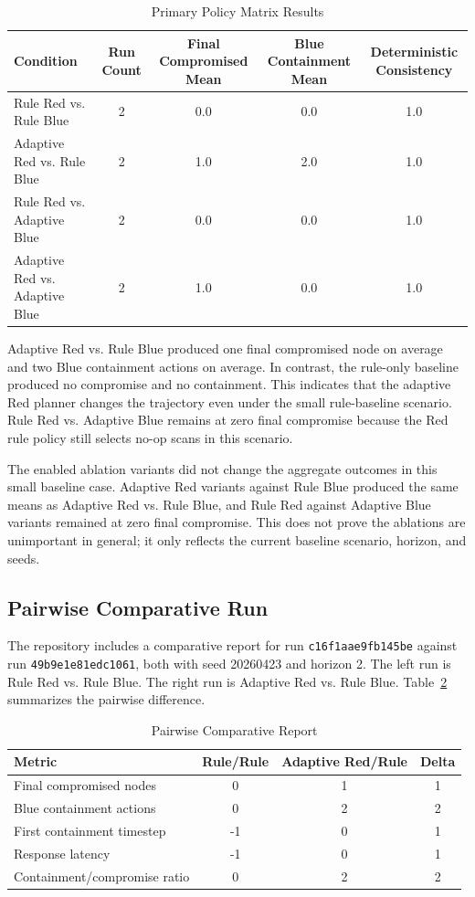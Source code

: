 \documentclass[conference]{IEEEtran}
\begin{document}
\begin{table}[htbp]
\centering
\caption{Primary Policy Matrix Results}
\label{tab:policy_results_comparison}
\begin{tabular}{|l|c|c|c|c|}
\hline
\textbf{Condition} & \textbf{Run Count} & \textbf{Final Compromised Mean} & \textbf{Blue Containment Mean} & \textbf{Deterministic Consistency} \\
\hline
Rule Red vs. Rule Blue & 2 & 0.0 & 0.0 & 1.0 \\
\hline
Adaptive Red vs. Rule Blue & 2 & 1.0 & 2.0 & 1.0 \\
\hline
Rule Red vs. Adaptive Blue & 2 & 0.0 & 0.0 & 1.0 \\
\hline
Adaptive Red vs. Adaptive Blue & 2 & 1.0 & 0.0 & 1.0 \\
\hline
\end{tabular}
\end{table}

Adaptive Red vs. Rule Blue produced one final compromised node on average and two Blue containment actions on average. In contrast, the rule-only baseline produced no compromise and no containment. This indicates that the adaptive Red planner changes the trajectory even under the small rule-baseline scenario. Rule Red vs. Adaptive Blue remains at zero final compromise because the Red rule policy still selects no-op scans in this scenario.

The enabled ablation variants did not change the aggregate outcomes in this small baseline case. Adaptive Red variants against Rule Blue produced the same means as Adaptive Red vs. Rule Blue, and Rule Red against Adaptive Blue variants remained at zero final compromise. This does not prove the ablations are unimportant in general; it only reflects the current baseline scenario, horizon, and seeds.

\subsection{Pairwise Comparative Run}
The repository includes a comparative report for run \texttt{c16f1aae9fb145be} against run \texttt{49b9e1e81edc1061}, both with seed 20260423 and horizon 2. The left run is Rule Red vs. Rule Blue. The right run is Adaptive Red vs. Rule Blue. Table~\ref{tab:comparative_results} summarizes the pairwise difference.

\begin{table}[H]
\centering
\caption{Pairwise Comparative Report}
\label{tab:comparative_results}
\begin{tabular}{|l|c|c|c|}
\hline
\textbf{Metric} & \textbf{Rule/Rule} & \textbf{Adaptive Red/Rule} & \textbf{Delta} \\
\hline
Final compromised nodes & 0 & 1 & 1 \\
\hline
Blue containment actions & 0 & 2 & 2 \\
\hline
First containment timestep & -1 & 0 & 1 \\
\hline
Response latency & -1 & 0 & 1 \\
\hline
Containment/compromise ratio & 0 & 2 & 2 \\
\hline
\end{tabular}
\end{table}
\end{document}
